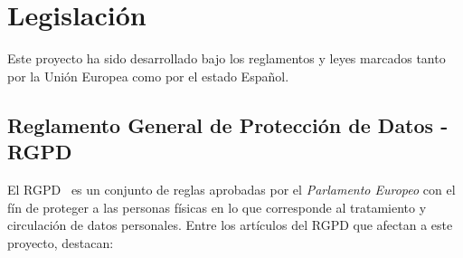 \section{Legislación}

Este proyecto ha sido desarrollado bajo los reglamentos y leyes marcados tanto por la Unión Europea como por el estado Español.

\subsection{Reglamento General de Protección de Datos - RGPD}
El RGPD~\cite{gdpr2016} es un conjunto de reglas aprobadas por el \textit{Parlamento Europeo} con el fín de proteger a las personas físicas en lo que corresponde al tratamiento y circulación de datos personales. Entre los artículos del RGPD que afectan a este proyecto, destacan:

